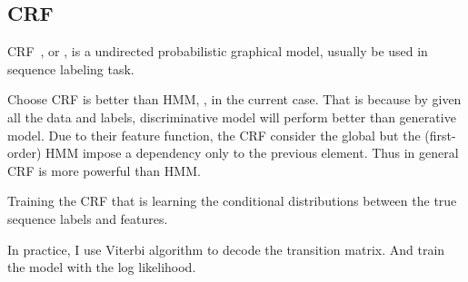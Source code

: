 \subsection{CRF}
\label{sec:crf}

CRF~\cite{lafferty2001conditional}, or , is a undirected probabilistic graphical model, usually be used in sequence labeling task.

Choose CRF is better than HMM, , in the current case. That is because by given all the data and labels, discriminative model will perform better than generative model. Due to their feature function, the CRF consider the global but the (first-order) HMM impose a dependency only to the previous element. Thus in general CRF is more powerful than HMM.

Training the CRF that is learning the conditional distributions between the true sequence labels and features. 

In practice, I use Viterbi algorithm to decode the transition matrix. And train the model with the log likelihood.

